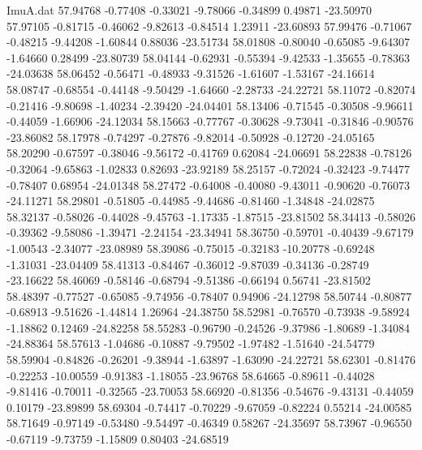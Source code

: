\begin{filecontents}{ImuA.dat}
  57.94768   -0.77408   -0.33021   -9.78066   -0.34899    0.49871  -23.50970
  57.97105   -0.81715   -0.46062   -9.82613   -0.84514    1.23911  -23.60893
  57.99476   -0.71067   -0.48215   -9.44208   -1.60844    0.88036  -23.51734
  58.01808   -0.80040   -0.65085   -9.64307   -1.64660    0.28499  -23.80739
  58.04144   -0.62931   -0.55394   -9.42533   -1.35655   -0.78363  -24.03638
  58.06452   -0.56471   -0.48933   -9.31526   -1.61607   -1.53167  -24.16614
  58.08747   -0.68554   -0.44148   -9.50429   -1.64660   -2.28733  -24.22721
  58.11072   -0.82074   -0.21416   -9.80698   -1.40234   -2.39420  -24.04401
  58.13406   -0.71545   -0.30508   -9.96611   -0.44059   -1.66906  -24.12034
  58.15663   -0.77767   -0.30628   -9.73041   -0.31846   -0.90576  -23.86082
  58.17978   -0.74297   -0.27876   -9.82014   -0.50928   -0.12720  -24.05165
  58.20290   -0.67597   -0.38046   -9.56172   -0.41769    0.62084  -24.06691
  58.22838   -0.78126   -0.32064   -9.65863   -1.02833    0.82693  -23.92189
  58.25157   -0.72024   -0.32423   -9.74477   -0.78407    0.68954  -24.01348
  58.27472   -0.64008   -0.40080   -9.43011   -0.90620   -0.76073  -24.11271
  58.29801   -0.51805   -0.44985   -9.44686   -0.81460   -1.34848  -24.02875
  58.32137   -0.58026   -0.44028   -9.45763   -1.17335   -1.87515  -23.81502
  58.34413   -0.58026   -0.39362   -9.58086   -1.39471   -2.24154  -23.34941
  58.36750   -0.59701   -0.40439   -9.67179   -1.00543   -2.34077  -23.08989
  58.39086   -0.75015   -0.32183  -10.20778   -0.69248   -1.31031  -23.04409
  58.41313   -0.84467   -0.36012   -9.87039   -0.34136   -0.28749  -23.16622
  58.46069   -0.58146   -0.68794   -9.51386   -0.66194    0.56741  -23.81502
  58.48397   -0.77527   -0.65085   -9.74956   -0.78407    0.94906  -24.12798
  58.50744   -0.80877   -0.68913   -9.51626   -1.44814    1.26964  -24.38750
  58.52981   -0.76570   -0.73938   -9.58924   -1.18862    0.12469  -24.82258
  58.55283   -0.96790   -0.24526   -9.37986   -1.80689   -1.34084  -24.88364
  58.57613   -1.04686   -0.10887   -9.79502   -1.97482   -1.51640  -24.54779
  58.59904   -0.84826   -0.26201   -9.38944   -1.63897   -1.63090  -24.22721
  58.62301   -0.81476   -0.22253  -10.00559   -0.91383   -1.18055  -23.96768
  58.64665   -0.89611   -0.44028   -9.81416   -0.70011   -0.32565  -23.70053
  58.66920   -0.81356   -0.54676   -9.43131   -0.44059    0.10179  -23.89899
  58.69304   -0.74417   -0.70229   -9.67059   -0.82224    0.55214  -24.00585
  58.71649   -0.97149   -0.53480   -9.54497   -0.46349    0.58267  -24.35697
  58.73967   -0.96550   -0.67119   -9.73759   -1.15809    0.80403  -24.68519

\end{filecontents}
